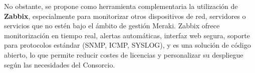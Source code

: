 No obstante, se propone como herramienta complementaria la utilización de \textbf{Zabbix}, especialmente para monitorizar otros dispositivos de red, servidores o servicios que no estén bajo el ámbito de gestión Meraki. Zabbix ofrece monitorización en tiempo real, alertas automáticas, interfaz web segura, soporte para protocolos estándar (SNMP, ICMP, SYSLOG), y es una solución de código abierto, lo que permite reducir costes de licencias y personalizar su despliegue según las necesidades del Consorcio.
